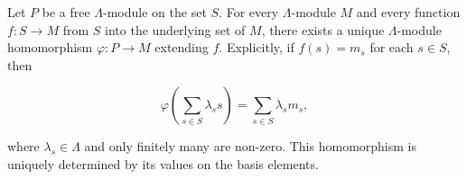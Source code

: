 Let $P$ be a free $\Lambda$-module on the set $S$. For every $\Lambda$-module $M$ and every function $f : S \rightarrow M$ from $S$ into the underlying set of $M$, there exists a unique $\Lambda$-module homomorphism $\varphi : P \rightarrow M$ extending $f$. Explicitly, if $f(s) = m_s$ for each $s \in S$, then

$$\varphi\left( \sum_{s \in S} \lambda_s s \right) = \sum_{s \in S} \lambda_s m_s,$$

where $\lambda_s \in \Lambda$ and only finitely many are non-zero. This homomorphism is uniquely determined by its values on the basis elements.

